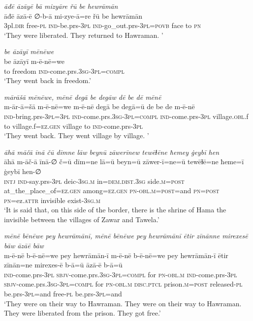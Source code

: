 \ea \label{BP.175}
\textit{āđē āzāyē bā mizyāre řū be hewrāmān} \\ 
\gll āđē āzā-ē ∅-b-ā mi-zye-ā=re řū be hewrāmān \\ 
 3pl\textsc{.dir} free\textsc{\textsc{-pl}} \textsc{ind-}be.prs\textsc{-3pl} \textsc{ind-}go\_out.prs\textsc{-3pl}\textsc{=\textsc{povb}} face to \textsc{pn} \\ 
\glt `They were liberated. They returned to Hawraman. '
\z 
 
\ea \label{BP.176}
\textit{be āzāyī mēnēwe} \\ 
\gll be āzāyī m-ē-nē=we \\ 
 to freedom \textsc{ind-}come.prs\textsc{.3sg}\textsc{-3pl}\textsc{=compl} \\ 
\glt `They went back in freedom.'
\z 
 
\ea \label{BP.177}
\textit{mārāšā mēnēwe, mēnē degā be degāw dē be dē mēnē} \\ 
\gll m-ār-ā=šā m-ē-nē=we m-ē-nē degā be degā=ū de be de m-ē-nē \\ 
 \textsc{ind-}bring.prs\textsc{-3pl}\textsc{=3pl} \textsc{ind-}come.prs\textsc{.3sg}\textsc{-3pl}\textsc{=compl} \textsc{ind-}come.prs\textsc{-3pl} village\textsc{.obl}.f to village.f\textsc{=ez.gen} village to \textsc{ind-}come.prs\textsc{-3pl} \\ 
\glt `They went back. They went village by village. '
\z 
 
\ea \label{BP.178}
\textit{āhā māčā īnā čū dīmne lāw beynū zāwerīnew tewēɫēne ħemey ġeybī hen} \\ 
\gll āhā m-āč-ā īnā-∅ č=ū dīm=ne lā=ū beyn=ū zāwer-ī=ne=ū tewēɫē=ne ħeme=ī ġeybī hen-∅ \\ 
 \textsc{intj} \textsc{ind-}say.prs\textsc{-3pl} deic\textsc{-3sg}\textsc{.m} in=\textsc{dem.dist}\textsc{.3sg} side\textsc{.m}\textsc{=\textsc{post}} at\_the\_place\_of\textsc{=ez.gen} among\textsc{=ez.gen} \textsc{pn}\textsc{-obl}\textsc{.m}\textsc{=\textsc{post}}=and \textsc{pn}\textsc{=\textsc{post}} \textsc{pn}=ez.\textsc{attr} invisible exist\textsc{-3sg}\textsc{.m} \\ 
\glt `It is said that, on this side of the border, there is the shrine of Hama the invisible between the villages of Zawar and Tawela.'
\z 
 
\ea \label{BP.179}
\textit{mēnē bēnēwe pey hewrāmānī, mēnē bēnēwe pey hewrāmānī ētir zīnānne mirexesē bāw āzāē bāw} \\ 
\gll m-ē-nē b-ē-nē=we pey hewrāmān-ī m-ē-nē b-ē-nē=we pey hewrāmān-ī ētir zīnān=ne mirexes-ē b-ā=ū āzā-ē b-ā=ū \\ 
 \textsc{ind-}come.prs\textsc{-3pl} \textsc{sbjv-}come.prs\textsc{.3sg}\textsc{-3pl}\textsc{=compl} for \textsc{pn}\textsc{-obl}\textsc{.m} \textsc{ind-}come.prs\textsc{-3pl} \textsc{sbjv-}come.prs\textsc{.3sg}\textsc{-3pl}\textsc{=compl} for \textsc{pn}\textsc{-obl}\textsc{.m} \textsc{disc.ptcl} prison\textsc{.m}\textsc{=\textsc{post}} released\textsc{\textsc{-pl}} be.prs\textsc{-3pl}=and free\textsc{\textsc{-pl}} be.prs\textsc{-3pl}=and \\ 
\glt `They were on their way to Hawraman. They were on their way to Hawraman. They were liberated from the prison. They got free.'
\z 
 
